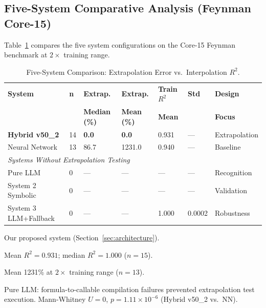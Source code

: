\documentclass[twoside,11pt]{article}
\begin{document}
\subsection{Five-System Comparative Analysis (Feynman Core-15)}\label{subsec:fivesystem-comparative-analysis-feynman-}
\label{sec:five_systems}

Table~\ref{tab:five_systems_full} compares the five system configurations on the
Core-15 Feynman benchmark at $2\times$ training range.

\begin{table}[htbp]
\centering
\begin{threeparttable}
\caption{Five-System Comparison: Extrapolation Error vs.\ Interpolation $R^2$.}
\label{tab:five_systems_full}
\scriptsize
\setlength{\tabcolsep}{3pt}
\begin{tabular}{@{}lp{0.6cm}p{1.3cm}p{1.3cm}p{1.4cm}p{0.7cm}p{1.4cm}@{}}
\toprule
\textbf{System} & \textbf{n} & \textbf{Extrap.} & \textbf{Extrap.} &
  \textbf{Train $R^{2}$} & \textbf{Std} & \textbf{Design} \\
 & & \textbf{Median (\%)} & \textbf{Mean (\%)} & \textbf{Mean} & & \textbf{Focus} \\
\midrule
\textbf{Hybrid v50\_2}\tnote{a} & 14 & \textbf{0.0} & \textbf{0.0} & 0.931\tnote{b} & --- & Extrapolation \\
Neural Network & 13 & 86.7 & 1231.0\tnote{c} & 0.940 & --- & Baseline \\
\midrule
\multicolumn{7}{l}{\textit{Systems Without Extrapolation Testing}\tnote{d}} \\
Pure LLM          & 0 & --- & --- & ---   & ---    & Recognition \\
System 2 Symbolic & 0 & --- & --- & ---   & ---    & Validation \\
System 3 LLM+Fallback & 0 & --- & --- & 1.000 & 0.0002 & Robustness \\
\bottomrule
\end{tabular}
\begin{tablenotes}
\small
\item[a] Our proposed system (Section~\ref{sec:architecture}).
\item[b] Mean $R^2 = 0.931$; median $R^2 = 1.000$ ($n=15$).
\item[c] Mean 1231\% at $2\times$ training range ($n=13$).
\item[d] Pure LLM: formula-to-callable compilation failures prevented
  extrapolation test execution.  Mann-Whitney $U=0$, $p=1.11\times10^{-6}$
  (Hybrid v50\_2 vs.\ NN).
\end{tablenotes}
\end{threeparttable}
\end{table}
\end{document}
